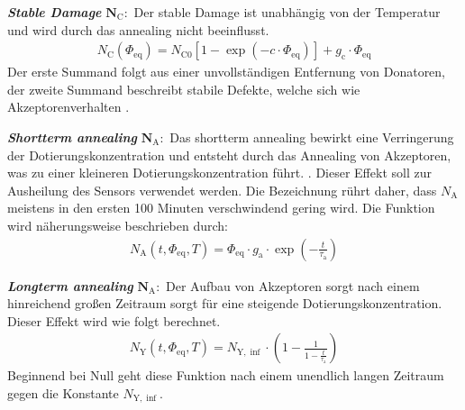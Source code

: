 \textbf{\textit{Stable Damage}} $\symbf{N_{\mathrm{C}}}:$ Der stable Damage ist unabhängig von der Temperatur und wird durch das annealing nicht beeinflusst.
\begin{align}
  N_{\mathrm{C}}(\Phi_{\mathrm{eq}}) = N_{\mathrm{C0}}[1-\exp{(-c \cdot \Phi_{\mathrm{eq}})}] + g_{\mathrm{c}} \cdot \Phi_{\mathrm{eq}}
\end{align}
Der erste Summand folgt aus einer unvollständigen Entfernung von Donatoren, der zweite Summand beschreibt stabile Defekte, welche sich wie Akzeptorenverhalten \cite{beyer}.


\textbf{\textit{Shortterm annealing}} $\symbf{N_{\mathrm{A}}}:$ Das shortterm annealing bewirkt eine Verringerung der Dotierungskonzentration und entsteht durch
das Annealing von Akzeptoren, was zu einer kleineren Dotierungskonzentration führt. . Dieser Effekt soll
zur Ausheilung des Sensors verwendet werden. Die Bezeichnung rührt daher, dass $N_{\mathrm{A}}$ meistens in den ersten 100 Minuten verschwindend gering wird. Die
Funktion wird näherungsweise beschrieben durch:
\begin{align}
  N_{\mathrm{A}}(t, \Phi_{\mathrm{eq}}, T) = \Phi_{\mathrm{eq}} \cdot g_{\mathrm{a}} \cdot \exp{\left(-\frac{t}{\tau_{\mathrm{a}}}\right)}
\end{align}


\textbf{\textit{Longterm annealing}} $\symbf{N_{\mathrm{A}}}:$ Der Aufbau von Akzeptoren sorgt nach einem hinreichend großen Zeitraum sorgt für eine steigende
Dotierungskonzentration. Dieser Effekt wird wie folgt berechnet.
\begin{align}
  N_{\mathrm{Y}}(t, \Phi_{\mathrm{eq}}, T)     = N_{\mathrm{Y, \inf}}\cdot \left(1 - \frac{1}{1 - \frac{t}{\tau_{\mathrm{a}}}}\right)
\end{align}
Beginnend bei Null geht diese Funktion nach einem unendlich langen Zeitraum gegen die Konstante $N_{\mathrm{Y, \inf}}$.
